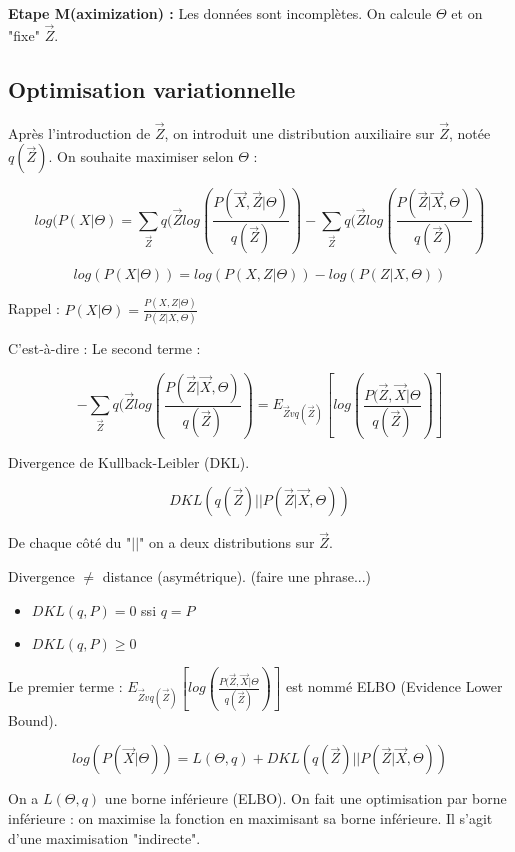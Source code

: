 \documentclass{article}
\begin{document}
\textbf{Etape M(aximization) :} Les données sont incomplètes. On calcule $\Theta$ et on "fixe" $\vec{Z}$.

\subsection{Optimisation variationnelle}

Après l'introduction de $\vec{Z}$, on introduit une distribution auxiliaire sur $\vec{Z}$, notée $q(\vec{Z})$. On souhaite maximiser selon $\Theta$ : 

\[ log(P(X | \Theta) = \sum_{\vec{Z}} q(\vec{Z} log(\frac{P(\vec{X}, \vec{Z} | \Theta)}{q(\vec{Z})} ) - \sum_{\vec{Z}} q(\vec{Z} log(\frac{P(\vec{Z} | \vec{X}, \Theta)}{q(\vec{Z})} ) \]

\[ log(P(X | \Theta)) = log(P(X, Z | \Theta)) - log(P(Z | X, \Theta)) \]

Rappel : $P(X | \Theta) = \frac{P(X, Z | \Theta)}{P(Z | X, \Theta)}$

C'est-à-dire : Le second terme : 

\[ - \sum_{\vec{Z}} q(\vec{Z} log(\frac{P(\vec{Z} | \vec{X}, \Theta)}{q(\vec{Z})} ) = E_{\vec{Z}vq(\vec{Z})} [log(\frac{P(\vec{Z}, \vec{X} | \Theta}{q(\vec{Z})})]  \]

Divergence de Kullback-Leibler (DKL).

\[ DKL(q(\vec{Z}) || P(\vec{Z} | \vec{X}, \Theta)) \]

De chaque côté du "$||$" on a deux distributions sur $\vec{Z}$.

Divergence $\ne$ distance (asymétrique). (faire une phrase...)
\begin{itemize}
\item $DKL(q, P) = 0$ ssi $q = P$
\item $DKL(q, P) \geq 0$ 
\end{itemize}

Le premier terme : $E_{\vec{Z}vq(\vec{Z})} [log(\frac{P(\vec{Z}, \vec{X} | \Theta}{q(\vec{Z})})] $ est nommé ELBO (Evidence Lower Bound).

\[ log(P(\vec{X} | \Theta)) = L(\Theta, q) + DKL(q(\vec{Z}) || P(\vec{Z} | \vec{X}, \Theta))  \]

On a $L(\Theta, q)$ une borne inférieure (ELBO). On fait une optimisation par borne inférieure : on maximise la fonction en maximisant sa borne inférieure. Il s'agit d'une maximisation "indirecte".
\end{document}
